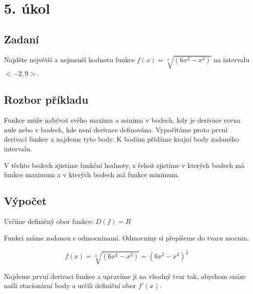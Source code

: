 \section{5. úkol}
\subsection{Zadaní}
 Najděte největší a nejmenší hodnotu funkce $f(x)=\sqrt[3]{(6x^2-x^3)} $ na intervalu $ <-2,9>$.

\subsection{Rozbor příkladu}
Funkce může nabývat svého maxima a minima v bodech, kdy je derivace rovna nule nebo v bodech, kde není derivace definována. Vypočítáme proto první derivaci funkce a najdeme tyto body. K bodům přidáme krajní body zadaného intervalu.

V těchto bodech zjistíme funkční hodnoty, z čehož zjistíme v kterých bodech má funkce maximum a v kterých bodech má funkce minimum.
\subsection{Výpočet}
Určíme definičný obor funkce: $D(f)=R$

Funkci máme zadanou s odmocninami. Odmocniny si přepíšeme do tvaru mocnin.

\begin{displaymath}
f(x)=\sqrt[3]{(6x^2-x^3)}=(6x^2-x^3)^\frac{1}{3}
\end{displaymath}

Najdeme první derivaci funkce a upravíme ji na vhodný tvar tak, abychom snáze našli stacionární body a určili definiční obor $f'(x)$.

